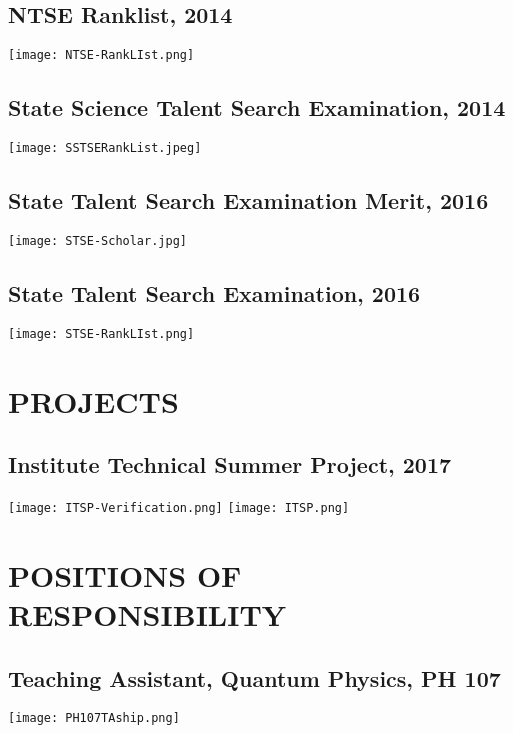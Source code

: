 \documentclass{article}
\begin{document}
	\subsection{NTSE Ranklist, 2014}
\begin{center}
	\texttt{[image: NTSE-RankLIst.png]}{\centering}
\end{center}
	\subsection{State Science Talent Search Examination, 2014}
\begin{center}
	\texttt{[image: SSTSERankList.jpeg]}{\centering}
\end{center}
	\subsection{State Talent Search Examination Merit, 2016}
\begin{center}
	\texttt{[image: STSE-Scholar.jpg]}{\centering}
\end{center}
	\subsection{State Talent Search Examination, 2016}
\begin{center}
	\texttt{[image: STSE-RankLIst.png]}{\centering}
\end{center}
\newpage
\section{PROJECTS}
	\subsection{Institute Technical Summer Project, 2017}
\begin{center}
	\texttt{[image: ITSP-Verification.png]}{\centering}
\vspace{20pt}
		\texttt{[image: ITSP.png]}{\centering}
\end{center}
\newpage
\section{POSITIONS OF RESPONSIBILITY}
	\subsection{Teaching Assistant, Quantum Physics, PH 107 }
\begin{center}
	\texttt{[image: PH107TAship.png]}{\centering}
\end{center}
\end{document}
